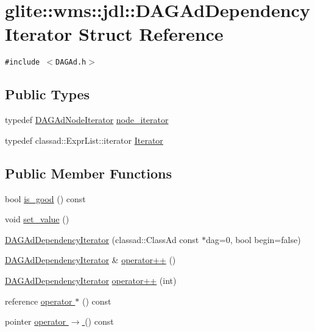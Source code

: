 \hypertarget{structglite_1_1wms_1_1jdl_1_1DAGAdDependencyIterator}{
\section{glite::wms::jdl::DAGAd\-Dependency\-Iterator Struct Reference}
\label{structglite_1_1wms_1_1jdl_1_1DAGAdDependencyIterator}
}
{\tt \#include $<$DAGAd.h$>$}

\subsection*{Public Types}
\begin{CompactItemize}
\item 
typedef \hyperlink{classglite_1_1wms_1_1jdl_1_1DAGAdNodeIterator}{DAGAd\-Node\-Iterator} \hyperlink{structglite_1_1wms_1_1jdl_1_1DAGAdDependencyIterator_w0}{node\_\-iterator}
\item 
typedef classad::Expr\-List::iterator \hyperlink{structglite_1_1wms_1_1jdl_1_1DAGAdDependencyIterator_w1}{Iterator}
\end{CompactItemize}
\subsection*{Public Member Functions}
\begin{CompactItemize}
\item 
bool \hyperlink{structglite_1_1wms_1_1jdl_1_1DAGAdDependencyIterator_a0}{is\_\-good} () const 
\item 
void \hyperlink{structglite_1_1wms_1_1jdl_1_1DAGAdDependencyIterator_a1}{set\_\-value} ()
\item 
\hyperlink{structglite_1_1wms_1_1jdl_1_1DAGAdDependencyIterator_a2}{DAGAd\-Dependency\-Iterator} (classad::Class\-Ad const $\ast$dag=0, bool begin=false)
\item 
\hyperlink{structglite_1_1wms_1_1jdl_1_1DAGAdDependencyIterator}{DAGAd\-Dependency\-Iterator} \& \hyperlink{structglite_1_1wms_1_1jdl_1_1DAGAdDependencyIterator_a3}{operator++} ()
\item 
\hyperlink{structglite_1_1wms_1_1jdl_1_1DAGAdDependencyIterator}{DAGAd\-Dependency\-Iterator} \hyperlink{structglite_1_1wms_1_1jdl_1_1DAGAdDependencyIterator_a4}{operator++} (int)
\item 
reference \hyperlink{structglite_1_1wms_1_1jdl_1_1DAGAdDependencyIterator_a5}{operator $\ast$} () const 
\item 
pointer \hyperlink{structglite_1_1wms_1_1jdl_1_1DAGAdDependencyIterator_a6}{operator $\rightarrow$ } () const 
\end{CompactItemize}
